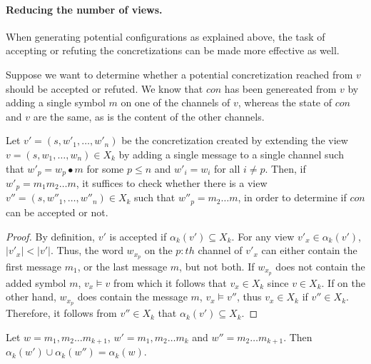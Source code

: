 \paragraph{Reducing the number of views.}
When generating potential configurations as explained above, the task of accepting or refuting the concretizations can be made more effective as well.

Suppose we want to determine whether a potential concretization  reached from $v$ should be accepted or refuted. We know that $con$ has been genereated from $v$ by adding a single symbol $m$ on one of the channels of $v$, whereas the state of $con$ and $v$ are the same, as is the content of the other channels.

\begin{lemma}
Let $v' = (s, w'_1, \ldots, w'_n)$ be the concretization created by extending the view $v = (s, w_1, \ldots, w_n) \in X_k$ by adding a single message to a single channel such that $w'_p = w_p \bullet m$ for some $p\leq n$ and $w'_i = w_i$ for all $i \neq p$. Then, if $w'_p = m_1 m_2 \ldots m$, it suffices to check whether there is a view $v'' = (s, w''_1, \ldots, w''_n) \in X_k$ such that $w''_p = m_2\ldots m$, in order to determine if $con$ can be accepted or not.
\end{lemma}

\begin{proof}
\label{altproof}
By definition, $v'$ is accepted if $\alpha_k(v') \subseteq X_k$. For any view $v'_x \in \alpha_k(v')$, $|v'_x| < |v'|$. Thus, the word $w_{x_p}$ on the $p:th$ channel of $v'_x$ can either contain the first message $m_1$, or the last message $m$, but not both. If $w_{x_p}$ does not contain the added symbol $m$, $v_x \models v$ from which it follows that $v_x \in X_k$ since $v \in X_k$. If on the other hand, $w_{x_p}$ does contain the message $m$, $v_x \models v''$, thus $v_x \in X_k$ if $v'' \in X_k$. Therefore, it follows from $v'' \in X_k$ that $\alpha_k(v') \subseteq X_k$.
\end{proof}

\begin{lemma}
Let $w = m_1, m_2\ldots m_{k+1}$, $w' = m_1,m_2\ldots m_k$ and $w'' = m_2\ldots m_{k+1}$. Then $\alpha_k(w') \cup \alpha_k(w'') = \alpha_k(w)$.\end{lemma}

